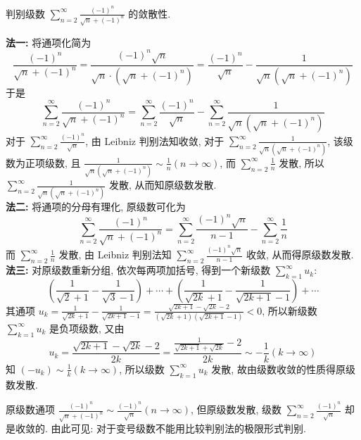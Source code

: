 \begin{example}
    判别级数 $\displaystyle  \sum_{n=2}^{\infty} \frac{(-1)^{n}}{\sqrt{n}+(-1)^{n}} $ 的敛散性.
\end{example}
\begin{solution}
    \textbf{法一: }将通项化简为
    $$\frac{(-1)^{n}}{\sqrt{n}+(-1)^{n}}=\frac{(-1)^{n} \sqrt{n}}{\sqrt{n} \cdot\left(\sqrt{n}+(-1)^{n}\right)}=\frac{(-1)^{n}}{\sqrt{n}}-\frac{1}{\sqrt{n}\left(\sqrt{n}+(-1)^{n}\right)}$$
    于是 $$\displaystyle  \sum_{n=2}^{\infty} \frac{(-1)^{n}}{\sqrt{n}+(-1)^{n}}=\sum_{n=2}^{\infty} \frac{(-1)^{n}}{\sqrt{n}}-\sum_{n=2}^{\infty} \frac{1}{\sqrt{n}\left(\sqrt{n}+(-1)^{n}\right)} $$
    对于 $\displaystyle  \sum_{n=2}^{\infty} \frac{(-1)^{n}}{\sqrt{n}} $, 由 Leibniz 判别法知收敛, 对于 $\displaystyle  \sum_{n=2}^{\infty} \frac{1}{\sqrt{n}\left(\sqrt{n}+(-1)^{n}\right)} $, 该级数为正项级数, 且 $\displaystyle  \frac{1}{\sqrt{n}\left(\sqrt{n}+(-1)^{n}\right)} \sim \frac{1}{n}(n \to \infty) $, 而 $\displaystyle  \sum_{n=2}^{\infty} \frac{1}{n} $ 发散, 所以 $\displaystyle  \sum_{n=2}^{\infty} \frac{1}{\sqrt{n}\left(\sqrt{n}+(-1)^{n}\right)} $ 发散, 从而知原级数发散.\\
    \textbf{法二: }将通项的分母有理化, 原级数可化为
    $$
        \sum_{n=2}^{\infty} \frac{(-1)^{n}}{\sqrt{n}+(-1)^{n}}=\sum_{n=2}^{\infty} \frac{(-1)^{n} \sqrt{n}}{n-1}-\sum_{n=2}^{\infty} \frac{1}{n}
    $$
    而 $\displaystyle  \sum_{n=2}^{\infty} \frac{1}{n} $ 发散, 由 Leibniz 判别法知 $\displaystyle  \sum_{n=2}^{\infty} \frac{(-1)^{n} \sqrt{n}}{n-1} $ 收敛, 从而得原级数发散.\\
    \textbf{法三: }对原级数重新分组, 依次每两项加括号, 得到一个新级数 $\displaystyle  \sum_{k=1}^{\infty} u_{k} $:
    $$\left(\frac{1}{\sqrt{2}+1}-\frac{1}{\sqrt{3}-1}\right)+\cdots+\left(\frac{1}{\sqrt{2 k}+1}-\frac{1}{\sqrt{2 k+1}-1}\right)+\cdots$$
    其通项 $\displaystyle  u_{k}=\frac{1}{\sqrt{2 k}+1}-\frac{1}{\sqrt{2 k+1}-1}=\frac{\sqrt{2 k+1}-\sqrt{2 k}-2}{(\sqrt{2 k}+1)(\sqrt{2 k+1}-1)}<0 $, 所以新级数 $\displaystyle  \sum_{k=1}^{\infty} u_{k} $ 是负项级数, 又由
    $$
        u_{k}=\frac{\sqrt{2 k+1}-\sqrt{2 k}-2}{2 k}=\frac{\frac{1}{\sqrt{2 k+1}+\sqrt{2 k}}-2}{2 k} \sim-\frac{1}{k}(k \to \infty)
    $$
    知 $\displaystyle  \left(-u_{k}\right) \sim \frac{1}{k}   (k \to \infty) $, 所以级数 $\displaystyle  \sum_{k=1}^{\infty} u_{k} $ 发散, 故由级数收敛的性质得原级数发散.
\end{solution}

原级数通项 $\displaystyle  \frac{(-1)^{n}}{\sqrt{n}+(-1)^{n}} \sim \frac{(-1)^{n}}{\sqrt{n}}(n \to \infty) $, 但原级数发散, 级数 $\displaystyle  \sum_{n=2}^{\infty} \frac{(-1)^{n}}{\sqrt{n}} $ 却是收敛的. 由此可见: 对于变号级数不能用比较判别法的极限形式判别.

